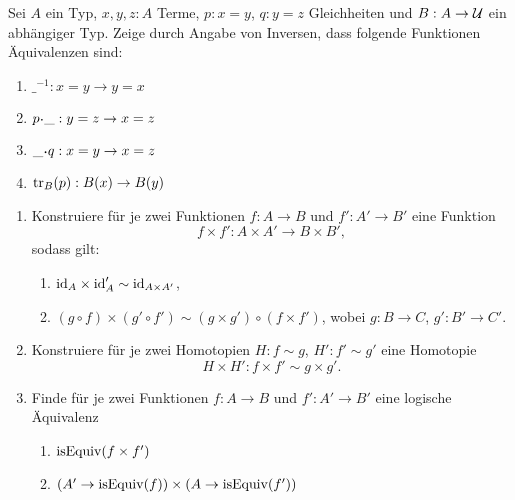 \documentclass{uebung}
\begin{document}

\begin{exercise}
  Sei $A$ ein Typ, $x,y,z:A$ Terme, $p:x=y$, $q:y=z$ Gleichheiten und $B:A\to\mathcal{U}$ ein abhängiger Typ.
  Zeige durch Angabe von Inversen, dass folgende Funktionen Äquivalenzen sind:
  \begin{enumerate}
    \item $\_^{-1}:x=y\to y=x$
    \item $p\kon\_:y=z\to x=z$
    \item $\_\kon q:x=y\to x=z$
    \item $\mathrm{tr}_B(p):B(x)\to B(y)$
  \end{enumerate}
\end{exercise}

\begin{exercise}
  \begin{enumerate}
    \item Konstruiere für je zwei Funktionen $f:A\to B$ und $f':A'\to B'$ eine Funktion
      $$
      f\times f':A\times A'\to B\times B',
      $$
      sodass gilt:
      \begin{enumerate}
        \item $\mathrm{id}_A\times\mathrm{id}_A'\sim\mathrm{id}_{A\times A'}$,
        \item $(g\circ f)\times (g'\circ f')\sim(g\times g')\circ (f\times f')$, wobei $g:B\to C$, $g':B'\to C'$.
      \end{enumerate}
    \item Konstruiere für je zwei Homotopien $H:f\sim g$, $H':f'\sim g'$ eine Homotopie
      $$
      H\times H':f\times f'\sim g\times g'.
      $$
    \item Finde für je zwei Funktionen $f:A\to B$ und $f':A'\to B'$ eine logische Äquivalenz
      \begin{enumerate}
        \item $\mathrm{isEquiv}(f\times f')$
        \item $(A'\to \mathrm{isEquiv}(f))\times (A\to\mathrm{isEquiv}(f'))$
      \end{enumerate}
  \end{enumerate}
\end{exercise}
\end{document}

